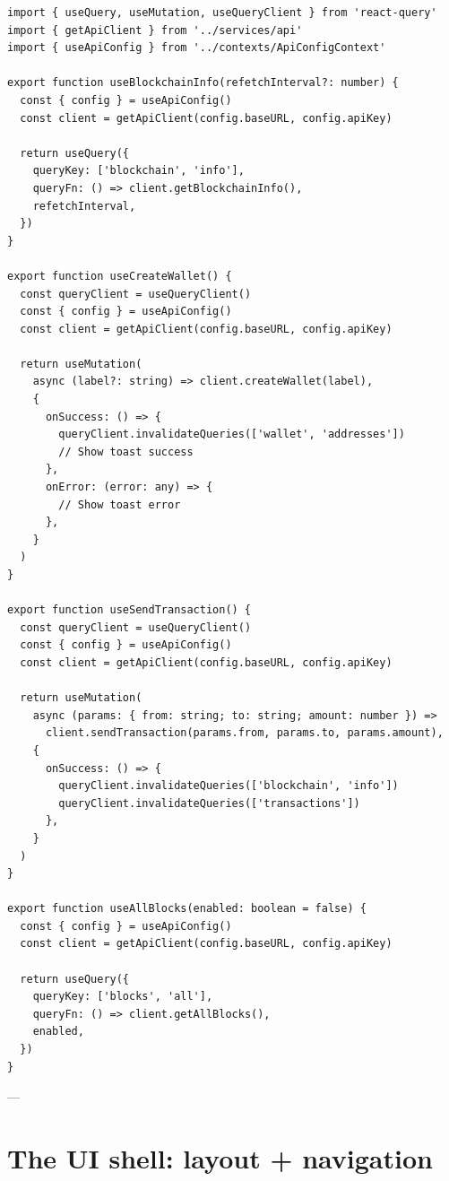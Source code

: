 \begin{listing}[htbp]
\caption{React Query hooks --- the data/caching surface}
\label{lst:ch21-hooks}
\begin{verbatim}
import { useQuery, useMutation, useQueryClient } from 'react-query'
import { getApiClient } from '../services/api'
import { useApiConfig } from '../contexts/ApiConfigContext'

export function useBlockchainInfo(refetchInterval?: number) {
  const { config } = useApiConfig()
  const client = getApiClient(config.baseURL, config.apiKey)

  return useQuery({
    queryKey: ['blockchain', 'info'],
    queryFn: () => client.getBlockchainInfo(),
    refetchInterval,
  })
}

export function useCreateWallet() {
  const queryClient = useQueryClient()
  const { config } = useApiConfig()
  const client = getApiClient(config.baseURL, config.apiKey)

  return useMutation(
    async (label?: string) => client.createWallet(label),
    {
      onSuccess: () => {
        queryClient.invalidateQueries(['wallet', 'addresses'])
        // Show toast success
      },
      onError: (error: any) => {
        // Show toast error
      },
    }
  )
}

export function useSendTransaction() {
  const queryClient = useQueryClient()
  const { config } = useApiConfig()
  const client = getApiClient(config.baseURL, config.apiKey)

  return useMutation(
    async (params: { from: string; to: string; amount: number }) =>
      client.sendTransaction(params.from, params.to, params.amount),
    {
      onSuccess: () => {
        queryClient.invalidateQueries(['blockchain', 'info'])
        queryClient.invalidateQueries(['transactions'])
      },
    }
  )
}

export function useAllBlocks(enabled: boolean = false) {
  const { config } = useApiConfig()
  const client = getApiClient(config.baseURL, config.apiKey)

  return useQuery({
    queryKey: ['blocks', 'all'],
    queryFn: () => client.getAllBlocks(),
    enabled,
  })
}
\end{verbatim}
\end{listing}

---

\section{The UI shell: layout + navigation}
\label{sec:layout-shell}

